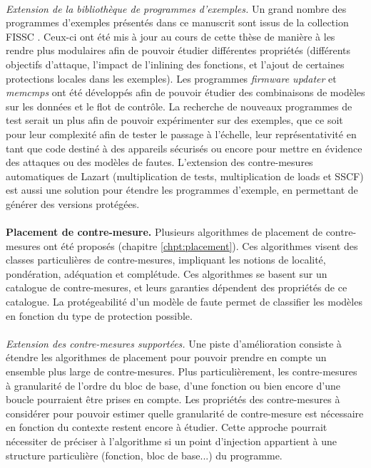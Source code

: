     \paragraph{}
    \textit{Extension de la bibliothèque de programmes d'exemples.}
    Un grand nombre des programmes d'exemples présentés dans ce manuscrit sont issus de la collection FISSC \cite{Dureuil/PPLCC16}.
    Ceux-ci ont été mis à jour au cours de cette thèse de manière à les rendre plus modulaires afin de pouvoir étudier différentes propriétés (différents objectifs d'attaque, l'impact de l'inlining des fonctions, et l'ajout de certaines protections locales dans les exemples).
    Les programmes \textit{firmware updater} et \textit{memcmps} ont été développés afin de pouvoir étudier des combinaisons de modèles sur les données et le flot de contrôle.
    La recherche de nouveaux programmes de test serait un plus afin de pouvoir expérimenter sur des exemples, que ce soit pour leur complexité afin de tester le passage à l'échelle, leur représentativité en tant que code destiné à des appareils sécurisés ou encore pour mettre en évidence des attaques ou des modèles de fautes. 
    L'extension des contre-mesures automatiques de Lazart (multiplication de tests, multiplication de loads et SSCF) est aussi une solution pour étendre les programmes d'exemple, en permettant de générer des versions protégées.

    \paragraph{}
    \textbf{Placement de contre-mesure.}  
    Plusieurs algorithmes de placement de contre-mesures ont été proposés (chapitre \ref{chpt:placement}).  
    Ces algorithmes visent des classes particulières de contre-mesures, impliquant les notions de localité, pondération, adéquation et complétude. Ces algorithmes se basent sur un catalogue de contre-mesures, et leurs garanties dépendent des propriétés de ce catalogue.
    La protégeabilité d'un modèle de faute permet de classifier les modèles en fonction du type de protection possible.   

    \paragraph{}
    \textit{Extension des contre-mesures supportées.}
    Une piste d'amélioration consiste à étendre les algorithmes de placement pour pouvoir prendre en compte un ensemble plus large de contre-mesures. Plus particulièrement, les contre-mesures à granularité de l'ordre du bloc de base, d'une fonction ou bien encore d'une boucle pourraient être prises en compte.
    Les propriétés des contre-mesures à considérer pour pouvoir estimer quelle granularité de contre-mesure est nécessaire en fonction du contexte restent encore à étudier.
    Cette approche pourrait nécessiter de préciser à l'algorithme si un point d'injection appartient à une structure particulière (fonction, bloc de base...) du programme.

